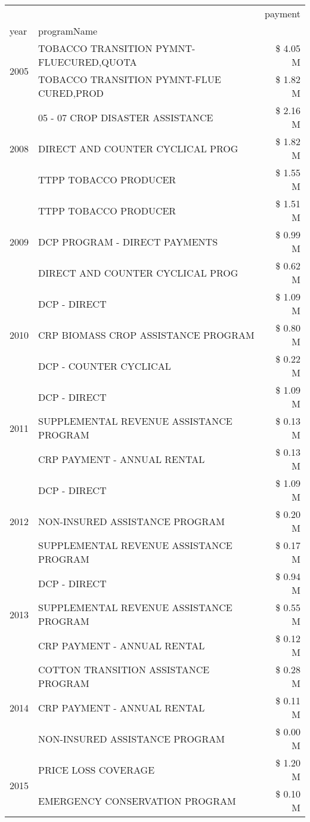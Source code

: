 \begin{tabular}{llr}
\toprule
 &  & payment \\
year & programName &  \\
\midrule
\multirow[t]{2}{*}{2005} & TOBACCO TRANSITION PYMNT-FLUECURED,QUOTA & \$ 4.05 M \\
 & TOBACCO TRANSITION PYMNT-FLUE CURED,PROD & \$ 1.82 M \\
\cline{1-3}
\multirow[t]{3}{*}{2008} & 05 - 07 CROP DISASTER ASSISTANCE & \$ 2.16 M \\
 & DIRECT AND COUNTER CYCLICAL PROG & \$ 1.82 M \\
 & TTPP TOBACCO PRODUCER & \$ 1.55 M \\
\cline{1-3}
\multirow[t]{3}{*}{2009} & TTPP TOBACCO PRODUCER & \$ 1.51 M \\
 & DCP PROGRAM - DIRECT PAYMENTS & \$ 0.99 M \\
 & DIRECT AND COUNTER CYCLICAL PROG & \$ 0.62 M \\
\cline{1-3}
\multirow[t]{3}{*}{2010} & DCP - DIRECT & \$ 1.09 M \\
 & CRP BIOMASS CROP ASSISTANCE PROGRAM & \$ 0.80 M \\
 & DCP - COUNTER CYCLICAL & \$ 0.22 M \\
\cline{1-3}
\multirow[t]{3}{*}{2011} & DCP - DIRECT & \$ 1.09 M \\
 & SUPPLEMENTAL REVENUE ASSISTANCE PROGRAM & \$ 0.13 M \\
 & CRP PAYMENT - ANNUAL RENTAL & \$ 0.13 M \\
\cline{1-3}
\multirow[t]{3}{*}{2012} & DCP - DIRECT & \$ 1.09 M \\
 & NON-INSURED ASSISTANCE PROGRAM & \$ 0.20 M \\
 & SUPPLEMENTAL REVENUE ASSISTANCE PROGRAM & \$ 0.17 M \\
\cline{1-3}
\multirow[t]{3}{*}{2013} & DCP - DIRECT & \$ 0.94 M \\
 & SUPPLEMENTAL REVENUE ASSISTANCE PROGRAM & \$ 0.55 M \\
 & CRP PAYMENT - ANNUAL RENTAL & \$ 0.12 M \\
\cline{1-3}
\multirow[t]{3}{*}{2014} & COTTON TRANSITION ASSISTANCE PROGRAM & \$ 0.28 M \\
 & CRP PAYMENT - ANNUAL RENTAL & \$ 0.11 M \\
 & NON-INSURED ASSISTANCE PROGRAM & \$ 0.00 M \\
\cline{1-3}
\multirow[t]{3}{*}{2015} & PRICE LOSS COVERAGE & \$ 1.20 M \\
 & EMERGENCY CONSERVATION PROGRAM & \$ 0.10 M \\

\end{tabular}
